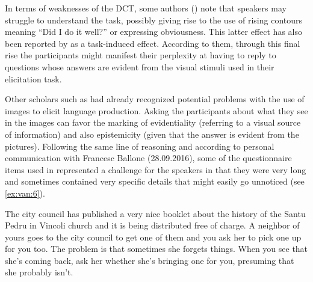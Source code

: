 \documentclass[output=paper]{LSP/langsci}
\begin{document}
In terms of weaknesses of the DCT, some authors (\citealt{Sichel-Bazin2015,Vanrell.unpublished,Vanrell2014sardinianpolar}) note that speakers may struggle to understand the task, possibly giving rise to the use of rising contours meaning “Did I do it well?” or expressing obviousness. This latter effect has also been reported by \citet{Vanrell.unpublished} as a task-induced effect. According to them, through this final rise the participants might manifest their perplexity at having to reply to questions whose answers are evident from the visual stimuli used in their elicitation task.

Other scholars such as \citet{Uth2014} had already recognized potential problems with the use of images to elicit language production. Asking the participants about what they see in the images can favor the marking of evidentiality (referring to a visual source of information) and also epistemicity (given that the answer is evident from the pictures). Following the same line of reasoning and according to personal communication with Francesc Ballone (28.09.2016), some of the questionnaire items used in \citet{Vanrell2014sardinianpolar} represented a challenge for the speakers in that they were very long and sometimes contained very specific details that might easily go unnoticed (see \ref{ex:van:6}).

\ea%
    \label{ex:van:6}

         The city council has published a very nice booklet about the history of the Santu Pedru in Vincoli church and it is being distributed free of charge. A neighbor of yours goes to the city council to get one of them and you ask her to pick one up for you too. The problem is that sometimes she forgets things. When you see that she’s coming back, ask her whether she’s bringing one for you, presuming that she probably isn’t.
    \z
\end{document}
